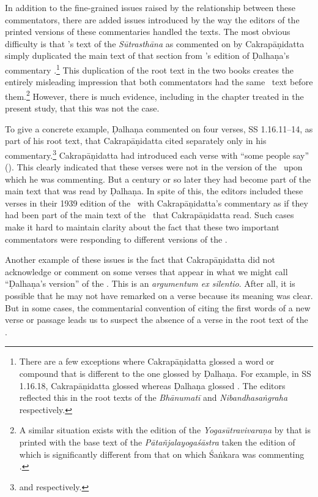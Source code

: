 In addition to the fine-grained issues raised by the relationship between these
commentators, there are added issues introduced by the way the editors of the
printed versions of these commentaries handled the texts. The most obvious
difficulty is that \citeauthor{acar-1939}'s text of the \emph{Sūtrasthāna} as
commented on by Cakrapāṇidatta \citep{acar-1939} simply duplicated the main text
of that section from \citeauthor{vulgate}'s edition of Ḍalhaṇa's commentary
\citep{vulgate}.\footnote{There are a few exceptions where Cakrapāṇidatta glossed
    a word or compound that is different to the one glossed by Ḍalhaṇa. For example,
    in SS 1.16.18, Cakrapāṇidatta glossed  whereas Ḍalhaṇa glossed
    .  The editors reflected this in the root texts of the
    \emph{Bhānumatī} \citep[130]{acar-1939} and \emph{Nibandhasaṅgraha}
    \citep[79]{vulgate} respectively.} This duplication of the root text in the two
    books creates the entirely misleading impression that both commentators had the
    same \SS\ text before them.\footnote{A similar situation exists with the edition
        of the \emph{Yogasūtravivaraṇa} by \citet{rama-1952} that is printed with the base
        text of the \emph{Pātañjalayogaśāstra} taken the edition of \citet{agas-1904}
        which is significantly different from that on which Śaṅkara was commenting
        \citep[77--78]{maas-2013}.} However, there is much evidence, including in the
        chapter treated in the present study, that this was not the case. 
        
To give a concrete example, Ḍalhaṇa commented on four verses, SS 1.16.11--14, as
part of his root text, that Cakrapāṇidatta cited separately only in his
commentary.\footnote{\cite[78]{vulgate} and \cite[128--129]{acar-1939}
    respectively.} Cakrapāṇidatta had introduced each verse with “some people say”
    (). This clearly indicated that these verses were not in the
    version of the \SS\ upon which he was commenting.  But a century or so later they
    had become part of the main text that was read by Ḍalhaṇa. In spite of this, the
    editors \citeauthor{acar-1939} included these verses in their 1939 edition of the
    \SS\ with Cakrapāṇidatta's commentary as if they had been part of the main text of
    the \SS\ that Cakrapāṇidatta read. Such cases make it hard to maintain clarity
    about the fact that these two important commentators were responding to different
    versions of the \SS.

Another example of these issues is the fact that Cakrapāṇidatta did not
acknowledge or comment on some verses that appear in what we might call “Ḍalhaṇa's
version” of the \SS.  This is an \emph{argumentum ex silentio}.  After all, it is
possible that he may not have remarked on a verse because its meaning was clear. 
But in some cases, the commentarial convention of citing the first words of a new
verse or passage leads us to suspect the absence of a verse in the root text of
the \SS.

